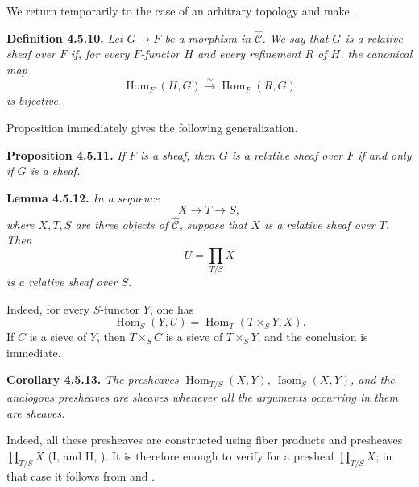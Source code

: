 
We return temporarily to the case of an arbitrary topology and make .

\medskip
\noindent{}\textbf{Definition 4.5.10.}
\textit{Let \(G\to F\) be a morphism in
\(\widehat{\mathscr C}\). We say that \(G\) is a \emph{relative sheaf
over \(F\)} if, for every \(F\)-functor \(H\) and every refinement \(R\)
of \(H\), the canonical map}
\[
\tag{+}\label{sga3:iv:definition:4:5:10:eq:unnamed:01}
  \operatorname{Hom}_{F}(H,G)
  \xrightarrow{\ \sim\ }
  \operatorname{Hom}_{F}(R,G)
\]
\textit{is bijective.}

Proposition  immediately gives the following generalization.

\medskip
\noindent{}\textbf{Proposition 4.5.11.}
\textit{If \(F\) is a sheaf, then \(G\) is a relative sheaf over \(F\) if
and only if \(G\) is a sheaf.}

\medskip
\noindent{}\textbf{Lemma 4.5.12.}
\textit{In a sequence}
\[
  X\longrightarrow T\longrightarrow S,
\]
\textit{where \(X,T,S\) are three objects of
\(\widehat{\mathscr C}\), suppose that \(X\) is a relative sheaf over
\(T\). Then}
\[
  U=\prod_{T/S}X
\]
\textit{is a relative sheaf over \(S\).}

Indeed, for every \(S\)-functor \(Y\), one has
\[
  \operatorname{Hom}_{S}(Y,U)
  =\operatorname{Hom}_{T}(T\times_SY,X).
\]
If \(C\) is a sieve of \(Y\), then \(T\times_SC\) is a sieve of
\(T\times_SY\), and the conclusion is immediate.

\medskip
\noindent{}\textbf{Corollary 4.5.13.}
\textit{The presheaves
\(\operatorname{Hom}_{T/S}(X,Y)\),
\(\operatorname{Isom}_{S}(X,Y)\), and the analogous presheaves are
sheaves whenever all the arguments occurring in them are sheaves.}

Indeed, all these presheaves are constructed using fiber products and
presheaves \(\prod_{T/S}X\) (I,  and II, ). It is therefore enough to
verify  for a presheaf \(\prod_{T/S}X\); in that case it
follows from  and .

